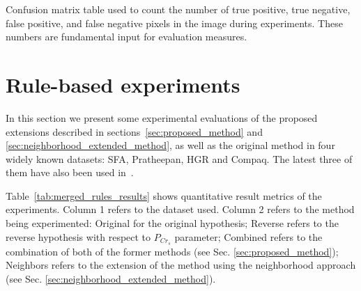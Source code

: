 \begin{table}[H]
    \centering


    \caption[Confusion matrix table used during experiments]{Confusion matrix table used to count the number of true positive, true negative, false positive, and false negative pixels in the image during experiments. These numbers are fundamental input for evaluation measures.}
    \label{tab:confusion_matrix}
\end{table}



\section{Rule-based experiments}
\label{sec:rule_based_experiments}
\noindent In this section we present some experimental evaluations of the proposed extensions described in sections~\ref{sec:proposed_method} and \ref{sec:neighborhood_extended_method}, as well as the original method in  four widely known datasets: SFA, Pratheepan, HGR and Compaq. The latest three of them have also been used in~\citet{brancati:17}.

Table~\ref{tab:merged_rules_results} shows quantitative result metrics of the experiments. Column 1 refers to the dataset used. Column 2 refers to the method being experimented: Original for the original hypothesis;  Reverse refers to the reverse hypothesis with respect to $P_{Cr_{s}}$ parameter; Combined refers to the combination of both of the former methods (see  Sec. \ref{sec:proposed_method}); Neighbors refers to the extension of the method using the neighborhood approach (see  Sec. \ref{sec:neighborhood_extended_method}).


